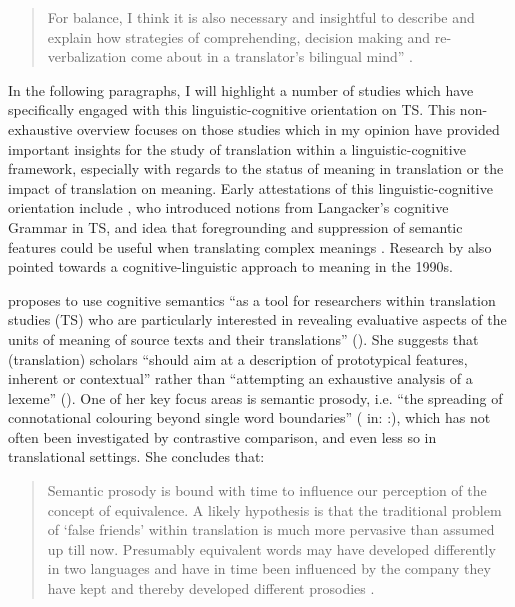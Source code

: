 \begin{quote}
For balance, I think it is also necessary and insightful to describe and explain how strategies of comprehending, decision making and re-verbalization come about in a translator’s bilingual mind” \citep[46]{house_towards_2013}. 
\end{quote}

In the following paragraphs, I will highlight a number of studies which have specifically engaged with this linguistic-cognitive orientation on TS. This non-exhaustive overview focuses on those studies which in my opinion have provided important insights for the study of translation within a linguistic-cognitive framework, especially with regards to the status of meaning in translation or the impact of translation on meaning. Early attestations of this linguistic-cognitive orientation include \citet{tabakowska_cognitive_1993}, who introduced notions from Langacker’s cognitive Grammar in TS, and  idea that foregrounding and suppression of semantic features could be useful when translating complex meanings \citep[8]{rojo_cognitive_2013}. Research by \citet{wilss_knowledge_1996} also pointed towards a cognitive-linguistic approach to meaning in the 1990s.

\citeyear{korning_zethsen_corpus-based_2008} proposes to use cognitive semantics “as a tool for researchers within translation studies (TS) who are particularly interested in revealing evaluative aspects of the units of meaning of source texts and their translations” (\citeyear[249]{2008}). She suggests that (translation) scholars “should aim at a description of prototypical features, inherent or contextual” rather than “attempting an exhaustive analysis of a lexeme” (\citeyear[251]{2008}). One of her key focus areas is semantic prosody, i.e. “the spreading of connotational colouring beyond single word boundaries” (\citealt[68]{partington_patterns_1998} in: \citealt[256]{korning_zethsen_corpus-based_2008}:), which has not often been investigated by contrastive comparison, and even less so in translational settings. She concludes that:

\begin{quote}
Semantic prosody is bound with time to influence our perception of the concept of equivalence. A likely hypothesis is that the traditional problem of ‘false friends’ within translation is much more pervasive than assumed up till now. Presumably equivalent words may have developed differently in two languages and have in time been influenced by the company they have kept and thereby developed different prosodies \citep[258]{korning_zethsen_corpus-based_2008}.
\end{quote}

